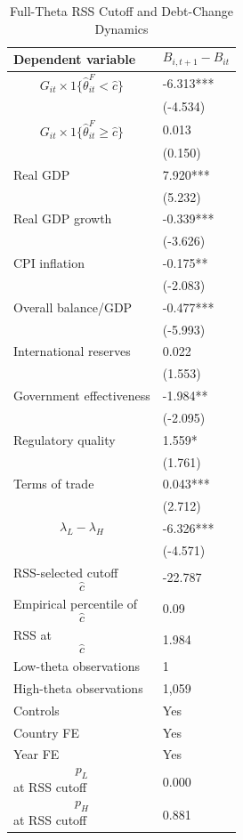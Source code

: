 \begin{table}[H]\centering
\begin{threeparttable}
\caption{Full-Theta RSS Cutoff and Debt-Change Dynamics}
\label{tab:deltaB_rss_cutoff_fulltheta}
\scriptsize
\begin{tabularx}{\textwidth}{lY}
\toprule
Dependent variable & $$B_{i,t+1}-B_{it}$$ \\
\midrule
$$G_{it}\times 1\{\widehat{\theta}^{F}_{it}<\widehat{c}\}$$ & -6.313*** \\
 & (-4.534) \\
$$G_{it}\times 1\{\widehat{\theta}^{F}_{it}\geq\widehat{c}\}$$ & 0.013 \\
 & (0.150) \\
Real GDP & 7.920*** \\
 & (5.232) \\
Real GDP growth & -0.339*** \\
 & (-3.626) \\
CPI inflation & -0.175** \\
 & (-2.083) \\
Overall balance/GDP & -0.477*** \\
 & (-5.993) \\
International reserves & 0.022 \\
 & (1.553) \\
Government effectiveness & -1.984** \\
 & (-2.095) \\
Regulatory quality & 1.559* \\
 & (1.761) \\
Terms of trade & 0.043*** \\
 & (2.712) \\
$$\lambda_L-\lambda_H$$ & -6.326*** \\
 & (-4.571) \\
\midrule
RSS-selected cutoff $$\widehat{c}$$ & -22.787 \\
Empirical percentile of $$\widehat{c}$$ & 0.09 \\
RSS at $$\widehat{c}$$ & 1.984 \\
Low-theta observations & 1 \\
High-theta observations & 1,059 \\
Controls & Yes \\
Country FE & Yes \\
Year FE & Yes \\
$$p_L$$ at RSS cutoff & 0.000 \\
$$p_H$$ at RSS cutoff & 0.881 \\

\end{tabularx}
\end{threeparttable}
\end{table}
